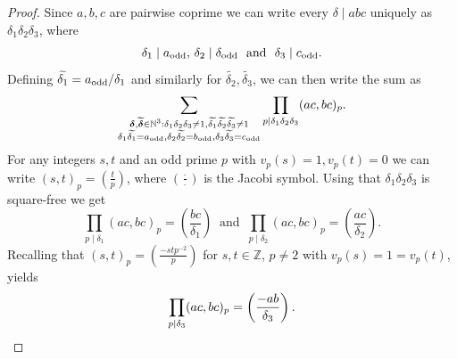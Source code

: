 \documentclass[a4paper,12pt,reqno]{amsart}
\numberwithin{equation}{section} \numberwithin{figure}{section}
\newcommand\Z{\mathbb{Z}}
\newcommand\N{\mathbb{N}}
\renewcommand{\#}{\sharp}
\theoremstyle{definition}
\numberwithin{lemma}{section}
\begin{document}
\begin{proof} Since $a,b,c $ are pairwise coprime we can write every $\delta \mid abc $ uniquely as $\delta_1\delta_2\delta_3$, where 
$$\delta_1\mid a_{\rm{odd}}, \, \delta_2\mid \delta_{\rm{odd}}
\ \textrm { and }  \ \delta_3 \mid c_{\rm{odd}}.$$ Defining $\widetilde {\delta_1}= a_{\rm{odd}}/\delta_1$ and similarly for $\widetilde {\delta_2}, 
\widetilde {\delta_3}$,  we can then write the sum as 
\[\sum_{\substack{\boldsymbol  \delta , \widetilde {\boldsymbol \delta} \in \N^3:
\delta_1  \delta_2\delta_3 \neq 1, 
\widetilde {\delta_1}\widetilde {\delta_2}\widetilde {\delta_3}\neq 1 
 \\ \delta_1\widetilde {\delta_1}= a_{\rm{odd}}, \delta_2\widetilde {\delta_2}=b_{\rm{odd}}, \delta_3 \widetilde {\delta_3}= c_{\rm{odd}}} }  \prod_{p\mid \delta_1 \delta_2\delta_3  } (ac,bc)_p .\] For any integers $s,t $ and an odd prime $p$ with $v_p(s)=1, v_p(t)=0$ we can write $(s,t)_p=(\frac{t}{p})$, where $(\frac{\cdot }{\cdot })$ is the Jacobi symbol. Using that  $\delta_1 \delta_2\delta_3$ is square-free we get 
\[\prod_{p\mid \delta_1   } (ac,bc)_p=  \left(\frac{bc}{\delta_1}\right)
\ \textrm{ and } \ \prod_{p\mid  \delta_2   } (ac,bc)_p=  \left(\frac{ac}{\delta_2}\right)
.\] Recalling that  $(s,t)_p=(\frac{-st p^{-2} }{p})$ for $s,t \in \Z$,  $p\neq 2 $ with $v_p(s)=1=v_p(t)$, yields 
\begin{equation*}
\prod_{p\mid \delta_3   } (ac,bc)_p=  \left(\frac{-ab}{\delta_3}\right). \qedhere
  \end{equation*} 
\end{proof} 
 
\end{document}

